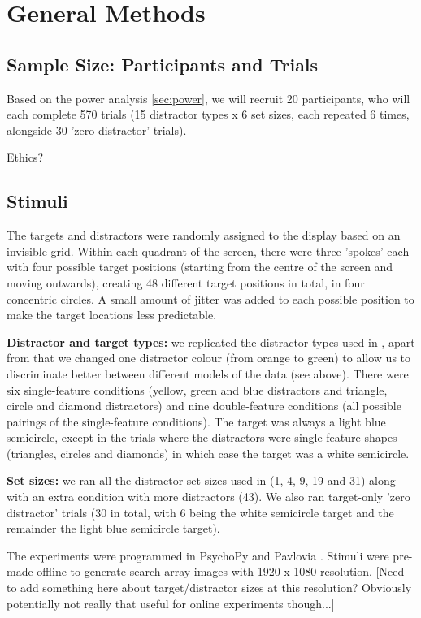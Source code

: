 \documentclass[smallextended, natbib]{svjour3}       %
\begin{document}
\section{General Methods}

\subsection{Sample Size: Participants and Trials}

Based on the power analysis \ref{sec:power}, we will recruit 20 participants, who will each
complete 570 trials (15 distractor types x 6 set sizes, each repeated 6 times, alongside 30 'zero distractor' trials).

Ethics?

\subsection{Stimuli}

The targets and distractors were randomly assigned to the display based on an invisible grid. Within each quadrant of the screen, there were three 'spokes' each with four possible target positions (starting from the centre of the screen and moving outwards), creating 48 different target positions in total, in four concentric circles. A small amount of jitter was added to each possible position to make the target locations less predictable.

\textbf{Distractor and target types:} we replicated the distractor types used in \cite{buetti2019predicting}, apart from that we changed one distractor colour (from orange to green) to allow us to discriminate better between different models of the data (see above). There were six single-feature conditions (yellow, green and blue distractors and triangle, circle and diamond distractors) and nine double-feature conditions (all possible pairings of the single-feature conditions). The target was always a light blue semicircle, except in the trials where the distractors were single-feature shapes (triangles, circles and diamonds) in which case the target was a white semicircle.

\textbf{Set sizes:} we ran all the distractor set sizes used in \cite{buetti2019predicting} (1, 4, 9, 19 and 31) along with an extra condition with more distractors (43). We also ran target-only 'zero distractor' trials (30 in total, with 6 being the white semicircle target and the remainder the light blue semicircle target).

The experiments were programmed in PsychoPy and Pavlovia \cite{peirce2019psychopy2}. Stimuli were pre-made offline to generate search array images with 1920 x 1080 resolution. [Need to add something here about target/distractor sizes at this resolution? Obviously potentially not really that useful for online experiments though...]
\end{document}
